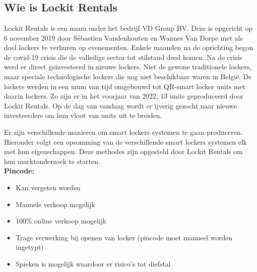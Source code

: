 \chapter{}%
\label{ch:stand-van-zaken}




\section{Wie is Lockit Rentals}%
\label{sec:lockitRentals}


Lockit Rentals is een naam onder het bedrijf VD Group BV. Deze is opgericht op 6 november 2019 door Sébastien Vandenhouten en Wannes Van Dorpe met als doel lockers te verhuren op evenementen. Enkele maanden na de oprichting begon de covid-19 crisis die de volledige sector tot stilstand deed komen. Na de crisis werd er direct geïnvesteerd in nieuwe lockers. Niet de gewone traditionele lockers, maar speciale technologische lockers die nog niet beschikbaar waren in België. De lockers werden in een mum van tijd omgebouwd tot QR-smart locker units met daarin lockers. Zo zijn er in het voorjaar van 2022, 13 units geproduceerd door Lockit Rentals. Op de dag van vandaag wordt er ijverig gezocht naar nieuwe investeerders om hun vloot van units uit te breiden.

Er zijn verschillende manieren om smart lockers systemen te gaan produceren. Hieronder volgt een opsomming van de verschillende smart lockers systemen elk met hun eigenschappen. Deze methodes zijn opgesteld door Lockit Rentals om hun marktonderzoek te starten.
\\
\textbf{Pincode:}
\begin{itemize}
    \item Kan vergeten worden
    \item Manuele verkoop mogelijk
    \item 100\% online verkoop mogelijk
    \item Trage verwerking bij openen van locker (pincode moet manueel worden ingetypt)
    \item Spieken is mogelijk waardoor er risico’s tot diefstal    
\end{itemize}
    
